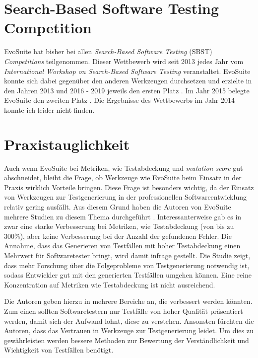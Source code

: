 \documentclass[a4paper,11pt]{article}
\begin{document}
\section{Search-Based Software Testing Competition}

EvoSuite hat bisher bei allen \textit{Search-Based Software Testing} (SBST) \textit{Competitions} teilgenommen.
Dieser Wettbewerb wird seit 2013 jedes Jahr vom \textit{International Workshop on Search-Based Software Testing} veranstaltet.
EvoSuite konnte sich dabei gegenüber den anderen Werkzeugen durchsetzen und erzielte in den Jahren 2013 und 2016 - 2019 jeweils den ersten Platz \cite{6571663, 7810701, 7967958, 8452806, 8812209}.
Im Jahr 2015 belegte EvoSuite den zweiten Platz \cite{7173585}.
Die Ergebnisse des Wettbewerbs im Jahr 2014 konnte ich leider nicht finden.

\section{Praxistauglichkeit}
\label{sec:praxistauglichkeit}

Auch wenn EvoSuite bei Metriken, wie Testabdeckung und \textit{mutation score} gut abschneidet, bleibt die Frage, ob Werkzeuge wie EvoSuite beim Einsatz in der Praxis wirklich Vorteile bringen.
Diese Frage ist besonders wichtig, da der Einsatz von Werkzeugen zur Testgenerierung in der professionellen Softwareentwicklung relativ gering ausfällt.
Aus diesem Grund haben die Autoren von EvoSuite mehrere Studien zu diesem Thema durchgeführt \cite{ISSTA13_Study, ISSTA15_Study, TOSEM_userstudy}.
Interessanterweise gab es in \cite{TOSEM_userstudy} zwar eine starke Verbesserung bei Metriken, wie Testabdeckung (von bis zu 300\%), aber keine Verbesserung bei der Anzahl der gefundenen Fehler.
Die Annahme, dass das Generieren von Testfällen mit hoher Testabdeckung einen Mehrwert für Softwaretester bringt, wird damit infrage gestellt.
Die Studie zeigt, dass mehr Forschung über die Folgeprobleme von Testgenerierung notwendig ist, sodass Entwickler gut mit den generierten Testfällen umgehen können.
Eine reine Konzentration auf Metriken wie Testabdeckung ist nicht ausreichend.

Die Autoren geben hierzu in \cite{TOSEM_userstudy} mehrere Bereiche an, die verbessert werden könnten.
Zum einen sollten Softwaretestern nur Testfälle von hoher Qualität präsentiert werden, damit sich der Aufwand lohnt, diese zu verstehen.
Ansonsten fürchten die Autoren, dass das Vertrauen in Werkzeuge zur Testgenerierung leidet.
Um dies zu gewährleisten werden bessere Methoden zur Bewertung der Verständlichkeit und Wichtigkeit von Testfällen benötigt.
\end{document}
